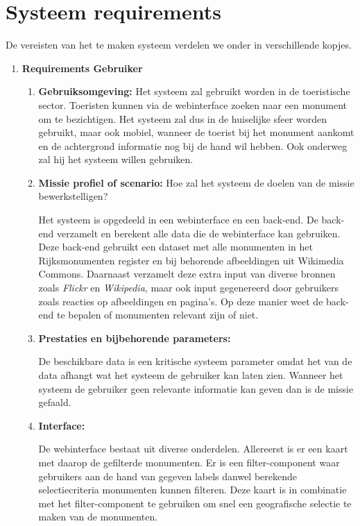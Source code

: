 \documentclass{article}
\begin{document}
\section{Systeem requirements}
De vereisten van het te maken systeem verdelen we onder in verschillende kopjes.
\begin{enumerate}
	
	\item{\textbf{Requirements Gebruiker}}
	\begin{enumerate}
		\item{\textbf{Gebruiksomgeving:}}		
		Het systeem zal gebruikt worden in de toeristische sector. Toeristen kunnen via de webinterface zoeken naar een monument om te bezichtigen. Het systeem zal dus in de huiselijke sfeer worden gebruikt, maar ook mobiel, wanneer de toerist bij het monument aankomt en de achtergrond informatie nog bij de hand wil hebben. Ook onderweg zal hij het systeem willen gebruiken.
		\item{\textbf{Missie profiel of scenario:}} Hoe zal het systeem de doelen van de missie bewerkstelligen? 
		
		Het systeem is opgedeeld in een webinterface en een back-end. De back-end verzamelt en berekent alle data die de webinterface kan gebruiken. Deze back-end gebruikt een dataset met alle monumenten in het Rijksmonumenten register en bij behorende afbeeldingen uit Wikimedia Commons. Daarnaast verzamelt deze extra input van diverse bronnen zoals \emph{Flickr} en \emph{Wikipedia}, maar ook input gegenereerd door gebruikers zoals reacties op afbeeldingen en pagina's. Op deze manier weet de back-end te bepalen of monumenten relevant zijn of niet. 
		
		\item{\textbf{Prestaties en bijbehorende parameters:}}
		
		De beschikbare data is een kritische systeem parameter omdat het van de data afhangt wat het systeem de gebruiker kan laten zien. Wanneer het systeem de gebruiker geen relevante informatie kan geven dan is de missie gefaald.
		
		\item{\textbf{Interface:}}
		
		De webinterface bestaat uit diverse onderdelen. Allereerst is er een kaart met daarop de gefilterde monumenten. Er is een filter-component waar gebruikers aan de hand van gegeven labels danwel berekende selectiecriteria monumenten kunnen filteren. Deze kaart is in combinatie met het filter-component te gebruiken om snel een geografische selectie te maken van de monumenten. 
		

\end{enumerate}
\end{enumerate}
\end{document}
